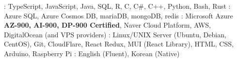 

\begin{cvparagraph}
  \raggedright
  : TypeScript, JavaScript, Java, SQL, R, C, C\#, C++, Python, Bash, Rust
  \linebreak
  : Azure SQL, Azure Cosmos DB, mariaDB, mongoDB, redis
  \linebreak
  : Microsoft Azure \textbf{AZ-900, AI-900, DP-900 Certified}, Naver Cloud Platform, AWS, DigitalOcean (and VPS providers)
  \linebreak
  : Linux/UNIX Server (Ubuntu, Debian, CentOS), Git, CloudFlare, React Redux, MUI (React Library), HTML, CSS, Arduino, Raspberry Pi
  \linebreak
  : English (Fluent), Korean (Native)
\end{cvparagraph}